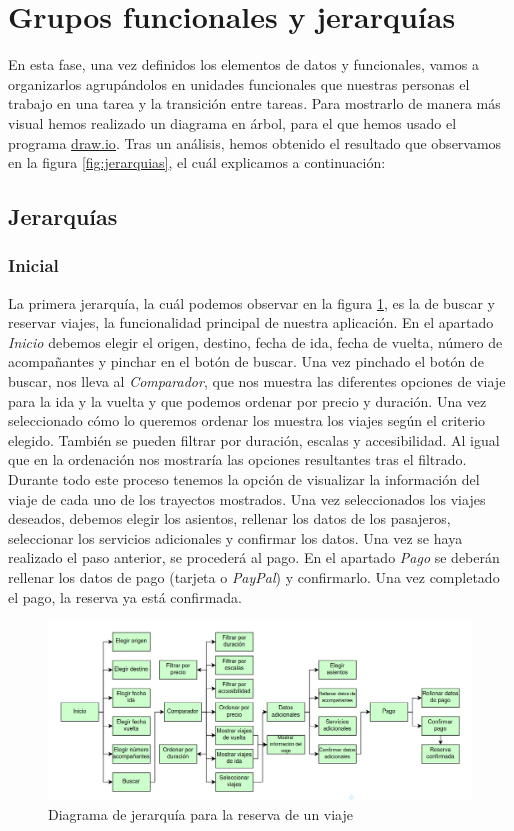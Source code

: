 \section{Grupos funcionales y jerarquías}

En esta fase, una vez definidos los elementos de datos y funcionales, vamos a
organizarlos agrupándolos en unidades funcionales que nuestras personas el
trabajo en una tarea y la transición entre tareas. Para mostrarlo de manera más
visual hemos realizado un diagrama en árbol, para el que hemos usado el
programa \underline{\href{https://www.drawio.com/}{draw.io}}. Tras un análisis, 
hemos obtenido el resultado que observamos en la figura \ref{fig:jerarquias}, el cuál explicamos a 
continuación:

\subsection{Jerarquías}

\subsubsection{Inicial}

La primera jerarquía, la cuál podemos observar en la figura \ref{fig:jerarquias1}, es la de buscar y
reservar viajes, la funcionalidad principal de nuestra aplicación. En el apartado \textit{Inicio}
debemos elegir el origen, destino, fecha de ida, fecha de vuelta, número de
acompañantes y pinchar en el botón de buscar. Una vez pinchado el botón de buscar, nos lleva al
\textit{Comparador}, que nos muestra las diferentes opciones de viaje para la ida y la vuelta y que podemos
ordenar por precio y duración. Una vez seleccionado cómo lo queremos ordenar los muestra los viajes
según el criterio elegido. También se pueden filtrar por duración, escalas y accesibilidad. Al
igual que en la ordenación nos mostraría las opciones resultantes tras el filtrado. Durante todo
este proceso tenemos la opción de visualizar la información del viaje de cada uno de
los trayectos mostrados. Una vez seleccionados los viajes deseados, debemos elegir los asientos,
rellenar los datos de los pasajeros, seleccionar los servicios adicionales y confirmar los datos.
Una vez se haya realizado el paso anterior, se procederá al pago. En el apartado \textit{Pago} se
deberán rellenar los datos de pago (tarjeta o \textit{PayPal}) y confirmarlo. Una vez completado el pago,
la reserva ya está confirmada.

\begin{figure}
      \centering
      \includegraphics[width=0.8\linewidth]{./Imagenes/jerarquia-viaje.png}
      \caption{Diagrama de jerarquía para la reserva de un viaje}
      \label{fig:jerarquias1}
\end{figure}

